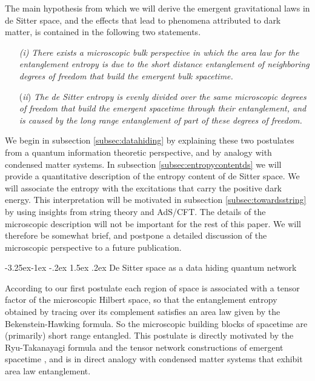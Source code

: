 \documentclass[a4paper,12pt]{article}
\makeatletter
\renewcommand\subsection{\@startsection{subsection}{2}{\z@}%
                                     {-3.25ex\@plus -1ex \@minus -.2ex}%
                                     {1.5ex \@plus .2ex}%
                                     {\normalfont\bfseries}}
\makeatother
\begin{document}
The main hypothesis from which we will derive the emergent gravitational laws in de Sitter space, and the effects that lead to phenomena attributed to dark matter, is contained in the following two statements.  
\begin{itemize}
\item[{\it (i)}] {\it There exists a microscopic {{bulk}} perspective in which the area law for the entanglement entropy is due to the {{short distance entanglement}}  of neighboring degrees of freedom that build the emergent bulk spacetime.}
\item[({\it ii})] {\it The de Sitter entropy is evenly divided over the same  microscopic  degrees of freedom that build the emergent spacetime through their entanglement, and is caused by the {{long range entanglement}} of part of these degrees of freedom. }
\end{itemize}  


\noindent We begin in subsection \ref{subsec:datahiding} by explaining these two postulates from a quantum information theoretic perspective, and by analogy with condensed matter systems. In subsection \ref{subsec:entropycontentds} we will provide a quantitative description of the entropy content of de Sitter space. We will associate the entropy with the excitations that carry  the positive dark energy. This interpretation will be motivated in subsection \ref{subsec:towardsstring} by using insights from string theory and AdS/CFT. The details of the microscopic description will not be important for the rest of this paper. We will therefore be somewhat brief, and postpone a detailed discussion of the microscopic perspective to a future publication. 



\subsection{De Sitter space as a data hiding quantum network}

\label{subsec:datahiding}

According to our first postulate each region of space is associated with a tensor factor of the microscopic Hilbert space, so that the entanglement entropy obtained by tracing over its complement satisfies an area law given by the Bekenstein-Hawking formula. So the microscopic building blocks of spacetime are (primarily) short range entangled. This postulate is directly motivated by the Ryu-Takanayagi formula and the tensor network constructions of emergent spacetime \cite{MERA, HarlowPreskill,Haydenetal}, and is in direct analogy with condensed matter systems that exhibit area law entanglement.
 
\end{document}
